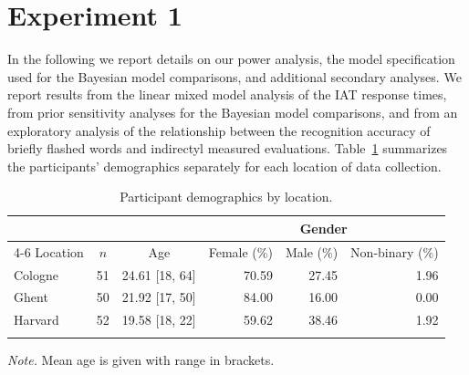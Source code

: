 \documentclass[
  doc]{apa6}
\begin{document}
\hypertarget{experiment-1}{%
\section{Experiment 1}\label{experiment-1}}

In the following we report details on our power analysis, the model specification used for the Bayesian model comparisons, and additional secondary analyses.
We report results from the linear mixed model analysis of the IAT response times, from prior sensitivity analyses for the Bayesian model comparisons, and from an exploratory analysis of the relationship between the recognition accuracy of briefly flashed words and indirectyl measured evaluations.
Table~\ref{tab:otm1-participant-table} summarizes the participants' demographics separately for each location of data collection.





\begin{table}[h]

\begin{center}
\begin{threeparttable}

\caption{\label{tab:otm1-participant-table}Participant demographics by location.}

\begin{tabular}{lrrrrr}
\toprule
 &  &  & \multicolumn{3}{c}{Gender} \\
\cmidrule(r){4-6}
Location & \multicolumn{1}{c}{$n$} & \multicolumn{1}{c}{Age} & \multicolumn{1}{c}{Female (\%)} & \multicolumn{1}{c}{Male (\%)} & \multicolumn{1}{c}{Non-binary (\%)}\\
\midrule
Cologne & 51 & 24.61 [18, 64] & 70.59 & 27.45 & 1.96\\
Ghent & 50 & 21.92 [17, 50] & 84.00 & 16.00 & 0.00\\
Harvard & 52 & 19.58 [18, 22] & 59.62 & 38.46 & 1.92\\
\bottomrule
\addlinespace
\end{tabular}

\begin{tablenotes}[para]
\normalsize{\textit{Note.} Mean age is given with range in brackets.}
\end{tablenotes}

\end{threeparttable}
\end{center}

\end{table}
\end{document}
